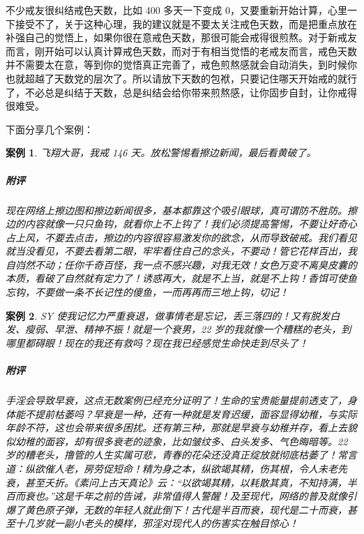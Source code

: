 \documentclass{ctexart}
\newtheorem{case}{案例}
\begin{document}
不少戒友很纠结戒色天数，比如 400 多天一下变成 0，又要重新开始计算，心里一下接受不了，关于这种心理，我的建议就是不要太关注戒色天数，而是把重点放在补强自己的觉悟上，如果你很在意戒色天数，那很可能会戒得很煎熬。对于新戒友而言，刚开始可以认真计算戒色天数，而对于有相当觉悟的老戒友而言，戒色天数并不需要太在意，等到你的觉悟真正完善了，戒色煎熬感就会自动消失，到时候你也就超越了天数党的层次了。所以请放下天数的包袱，只要记住哪天开始戒的就行了，不必总是纠结于天数，总是纠结会给你带来煎熬感，让你固步自封，让你戒得很难受。

下面分享几个案例：

\begin{case}
    飞翔大哥，我戒 146 天。放松警惕看擦边新闻，最后看黄破了。
    \subparagraph{附评} 现在网络上擦边图和擦边新闻很多，基本都靠这个吸引眼球，真可谓防不胜防。擦边的内容就像一只只鱼钩，就看你上不上钩了！我们必须提高警惕，不要让好奇心占上风，不要去点击，擦边的内容很容易激发你的欲念，从而导致破戒。我们看见就当没看见，不要去看第二眼，牢牢看住自己的念头，不要动！管它花样百出，我自岿然不动；任你千奇百怪，我一点不感兴趣，对我无效！女色万变不离臭皮囊的本质，看破了自然就有定力了！诱惑再大，就是不上当，就是不上钩！香饵可使鱼忘钩，不要做一条不长记性的傻鱼，一而再再而三地上钩，切记！
\end{case}

\begin{case}
    SY 使我记忆力严重衰退，做事情老是忘记，丢三落四的！又有脱发白发、瘦弱、早泄、精神不振！就是一个衰男，22 岁的我就像一个糟糕的老头，到哪里都碍眼！现在的我还有救吗？现在我已经感觉生命快走到尽头了！
    \subparagraph{附评} 手淫会导致早衰，这点无数案例已经充分证明了！生命的宝贵能量提前透支了，身体能不提前枯萎吗？早衰是一种，还有一种就是发育迟缓，面容显得幼稚，与实际年龄不符，这也会带来很多困扰。还有第三种，那就是早衰与幼稚并存，看上去貌似幼稚的面容，却有很多衰老的迹象，比如皱纹多、白头发多、气色晦暗等。22 岁的糟老头，撸管的人生实属可悲，青春的花朵还没真正绽放就彻底枯萎了！常言道：纵欲催人老，房劳促短命！精为身之本，纵欲竭其精，伤其根，令人未老先衰，甚至夭折。《素问上古天真论》云：“以欲竭其精，以耗散其真，不知持满，半百而衰也。”这是千年之前的告诫，非常值得人警醒！及至现代，网络的普及就像引爆了黄色原子弹，无数的年轻人就此倒下！古代是半百而衰，现代是二十而衰，甚至十几岁就一副小老头的模样，邪淫对现代人的伤害实在触目惊心！
\end{case}
\end{document}
